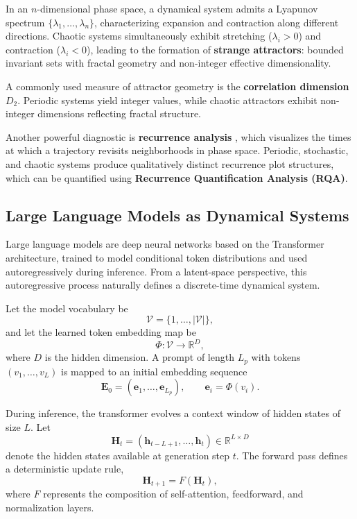 \documentclass[aip%
 aip,
 amsmath,amssymb,
 reprint,%
]{revtex4-1}
\begin{document}
In an $n$-dimensional phase space, a dynamical system admits a Lyapunov spectrum $\{\lambda_1,\dots,\lambda_n\}$, characterizing expansion and contraction along different directions. Chaotic systems simultaneously exhibit stretching ($\lambda_i>0$) and contraction ($\lambda_i<0$), leading to the formation of \textbf{strange attractors}: bounded invariant sets with fractal geometry and non-integer effective dimensionality.

A commonly used measure of attractor geometry is the \textbf{correlation dimension} $D_2$.
Periodic systems yield integer values, while chaotic attractors exhibit non-integer dimensions reflecting fractal structure.

Another powerful diagnostic is \textbf{recurrence analysis} \cite{MARWAN2007237}, which visualizes the times at which a trajectory revisits neighborhoods in phase space. Periodic, stochastic, and chaotic systems produce qualitatively distinct recurrence plot structures, which can be quantified using \textbf{Recurrence Quantification Analysis (RQA)}.

\subsection{Large Language Models as Dynamical Systems}
\label{subsec:llms_dynamics}

Large language models are deep neural networks based on the Transformer architecture, trained to model conditional token distributions and used autoregressively during inference. From a latent-space perspective, this autoregressive process naturally defines a discrete-time dynamical system.

Let the model vocabulary be
\begin{equation}
\mathcal{V} = \{1,\dots,|\mathcal{V}|\},
\end{equation}
and let the learned token embedding map be
\begin{equation}
\Phi : \mathcal{V} \rightarrow \mathbb{R}^D,
\end{equation}
where $D$ is the hidden dimension. A prompt of length $L_p$ with tokens $(v_1,\dots,v_L)$ is mapped to an initial embedding sequence
\begin{equation}
\mathbf{E}_0 = (\mathbf{e}_1,\dots,\mathbf{e}_{L_p}), 
\qquad 
\mathbf{e}_i = \Phi(v_i).
\end{equation}

During inference, the transformer evolves a context window of hidden states of size $L$. Let
\begin{equation}
\mathbf{H}_t = (\mathbf{h}_{t-L+1},\dots,\mathbf{h}_t) \in \mathbb{R}^{L \times D}
\end{equation}
denote the hidden states available at generation step $t$. The forward pass defines a deterministic update rule,
\begin{equation}
\mathbf{H}_{t+1} = F(\mathbf{H}_t),
\end{equation}
where $F$ represents the composition of self-attention, feedforward, and normalization layers.
\end{document}
